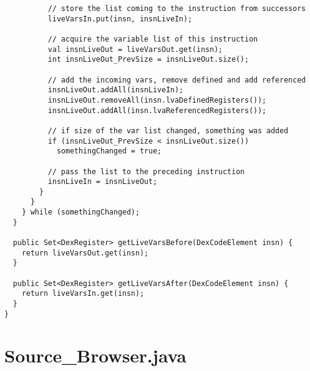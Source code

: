 \begin{lstlisting}
          // store the list coming to the instruction from successors
          liveVarsIn.put(insn, insnLiveIn);

          // acquire the variable list of this instruction  
          val insnLiveOut = liveVarsOut.get(insn);
          int insnLiveOut_PrevSize = insnLiveOut.size();

          // add the incoming vars, remove defined and add referenced
          insnLiveOut.addAll(insnLiveIn);
          insnLiveOut.removeAll(insn.lvaDefinedRegisters());
          insnLiveOut.addAll(insn.lvaReferencedRegisters());

          // if size of the var list changed, something was added
          if (insnLiveOut_PrevSize < insnLiveOut.size())
            somethingChanged = true;

          // pass the list to the preceding instruction
          insnLiveIn = insnLiveOut;
        }
      }
    } while (somethingChanged);
  }

  public Set<DexRegister> getLiveVarsBefore(DexCodeElement insn) {
    return liveVarsOut.get(insn);
  }

  public Set<DexRegister> getLiveVarsAfter(DexCodeElement insn) {
    return liveVarsIn.get(insn);
  }
}
\end{lstlisting}

\clearpage

\section{Source\_Browser.java}

